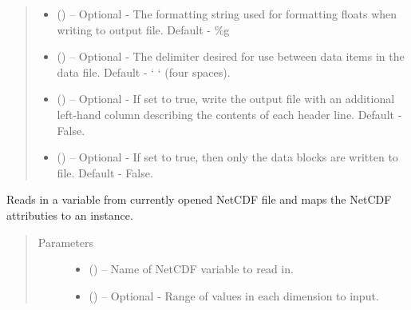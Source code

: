 \documentclass[a4paper,10pt,openany,english]{sphinxmanual}
\begin{document}
\begin{fulllineitems}
\begin{fulllineitems}
\begin{quote}
\begin{description}
\begin{itemize}
\item {} 
 () -- Optional - The formatting string used for formatting floats when writing
to output file. Default - \%g

\item {} 
 () -- Optional - The delimiter desired for use between data items in the data
file. Default - `    ` (four spaces).

\item {} 
 () -- Optional - If set to true, write the output file with an additional left-hand
column describing the contents of each header line. Default - False.

\item {} 
 () -- Optional - If set to true, then only the data blocks are written to file.
Default - False.

\end{itemize}

\end{description}\end{quote}

\end{fulllineitems}


\begin{fulllineitems}
\label{egadsapi:egads.input.netcdf_io.EgadsNetCdf.read_variable}
Reads in a variable from currently opened NetCDF file and maps the NetCDF
attributies to an  instance.
\begin{quote}\begin{description}
\item[{Parameters}] \leavevmode\begin{itemize}
\item {} 
 () -- Name of NetCDF variable to read in.

\item {} 
 () -- Optional - Range of values in each dimension to input.


\end{itemize}
\end{description}
\end{quote}
\end{fulllineitems}
\end{fulllineitems}
\end{document}
